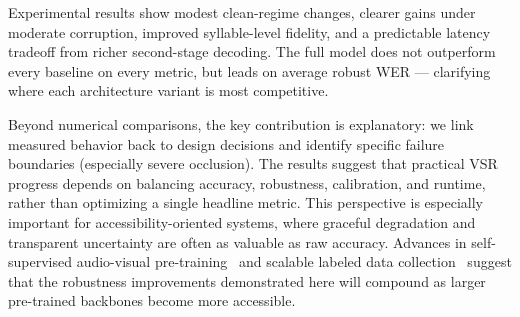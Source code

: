 \documentclass[10pt,twocolumn,letterpaper]{article}
\begin{document}
Experimental results show modest clean-regime changes, clearer gains under moderate corruption, improved syllable-level fidelity, and a predictable latency tradeoff from richer second-stage decoding. The full model does not outperform every baseline on every metric, but leads on average robust WER — clarifying where each architecture variant is most competitive.

Beyond numerical comparisons, the key contribution is explanatory: we link measured behavior back to design decisions and identify specific failure boundaries (especially severe occlusion). The results suggest that practical VSR progress depends on balancing accuracy, robustness, calibration, and runtime, rather than optimizing a single headline metric. This perspective is especially important for accessibility-oriented systems, where graceful degradation and transparent uncertainty are often as valuable as raw accuracy. Advances in self-supervised audio-visual pre-training~\cite{shi2022avhubert,shi2022robust} and scalable labeled data collection~\cite{ma2023autoavsr} suggest that the robustness improvements demonstrated here will compound as larger pre-trained backbones become more accessible.



\end{document}
